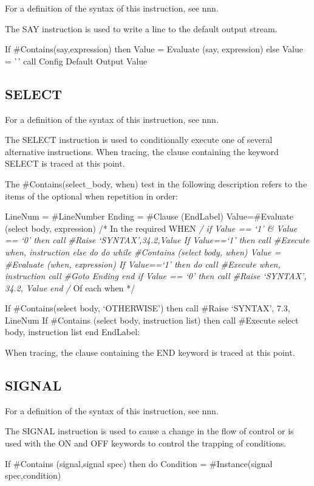 For a definition of the syntax of this instruction, see nnn.

The SAY instruction is used to write a line to the default output
stream.

If \#Contains(say,expression) then Value = Evaluate (say, expression)
else Value = '\,' call Config Default Output Value

\hypertarget{select}{%
\subsection{SELECT}\label{select}}

For a definition of the syntax of this instruction, see nnn.

The SELECT instruction is used to conditionally execute one of several
alternative instructions. When tracing, the clause containing the
keyword SELECT is traced at this point.

The \#Contains(select\_body, when) test in the following description
refers to the items of the optional when repetition in order:

LineNum = \#LineNumber Ending = \#Clause (EndLabel) Value=\#Evaluate
(select body, expression) /* In the required WHEN \emph{/ if Value ==
`1' \& Value == `0' then call \#Raise `SYNTAX',34.2,Value If Value==`1'
then call \#Execute when, instruction else do do while \#Contains
(select body, when) Value = \#Evaluate (when, expression) If Value==`1'
then do call \#Execute when, instruction call \#Goto Ending end if Value
== `0' then call \#Raise `SYNTAX', 34.2, Value end /} Of each when */

If \#Contains(select body, `OTHERWISE') then call \#Raise `SYNTAX', 7.3,
LineNum If \#Contains (select body, instruction list) then call
\#Execute select body, instruction list end EndLabel:

When tracing, the clause containing the END keyword is traced at this
point.

\hypertarget{signal}{%
\subsection{SIGNAL}\label{signal}}

For a definition of the syntax of this instruction, see nnn.

The SIGNAL instruction is used to cause a change in the flow of control
or is used with the ON and OFF keywords to control the trapping of
conditions.

If \#Contains (signal,signal spec) then do Condition = \#Instance(signal
spec,condition)

